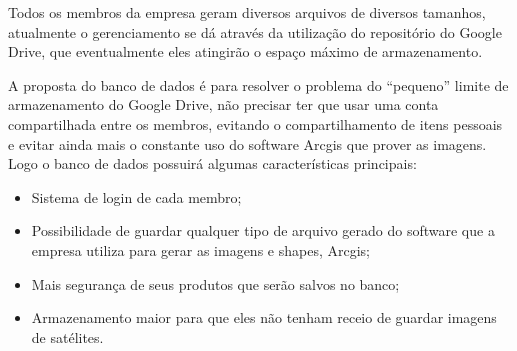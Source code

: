   Todos os membros da empresa geram diversos arquivos de diversos tamanhos, atualmente o gerenciamento se dá através da utilização do
  repositório do Google Drive, que eventualmente eles atingirão o espaço máximo de armazenamento.

  A proposta do banco de dados é para resolver o problema do “pequeno” limite de armazenamento do Google Drive, não precisar ter que
  usar uma conta compartilhada entre os membros, evitando o compartilhamento de itens pessoais e evitar ainda mais o constante uso do
  software Arcgis que prover as imagens. Logo o banco de dados possuirá algumas características principais:

  \begin{itemize}
    \item{Sistema de login de cada membro;}
    \item{Possibilidade de guardar qualquer tipo de arquivo gerado do software que a empresa utiliza para gerar as imagens e shapes,
      Arcgis;}
    \item{Mais segurança de seus produtos que serão salvos no banco;}
    \item{Armazenamento maior para que eles não tenham receio de guardar imagens de satélites.}
  \end{itemize}

